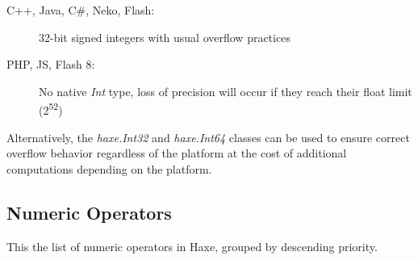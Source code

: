 \begin{description}
 \item[C++, Java, C\#, Neko, Flash:] 32-bit signed integers with usual overflow practices 
 \item[PHP, JS, Flash 8:] No native \emph{Int} type, loss of precision will occur if they reach their float limit (2\textsuperscript{52})
\end{description}

Alternatively, the \emph{haxe.Int32} and \emph{haxe.Int64} classes can be used to ensure correct overflow behavior regardless of the platform at the cost of additional computations depending on the platform.

\subsection{Numeric Operators}
\label{types-numeric-operators}

This the list of numeric operators in Haxe, grouped by descending priority.


